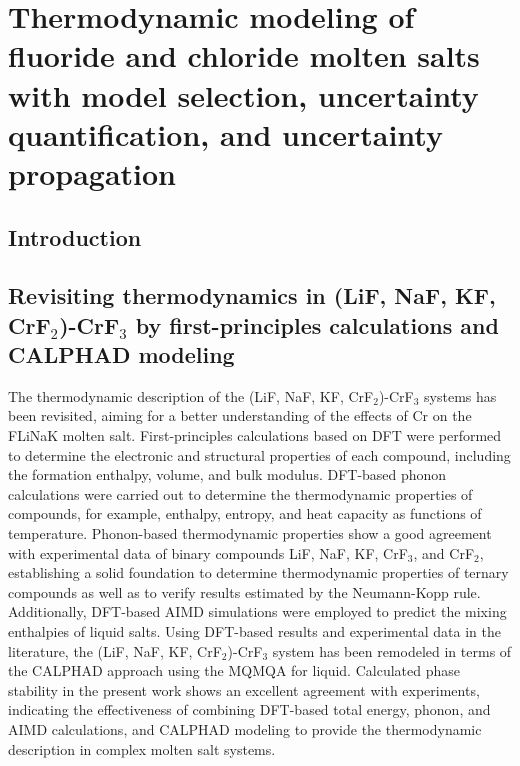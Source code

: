 \chapter{Thermodynamic modeling of fluoride and chloride molten salts with model selection, uncertainty quantification, and uncertainty propagation} \label{chap:moltensalts}

\section{Introduction} \label{moltensalts:sec:intro}

\section{Revisiting thermodynamics in (LiF, NaF, KF, CrF${_2}$)-CrF${_3}$ by first-principles calculations and CALPHAD modeling} \label{moltensalts:sec:FLiNaKCr}
The thermodynamic description of the (LiF, NaF, KF, CrF$_2$)-CrF$_3$ systems has been revisited, aiming for a better understanding of the effects of Cr on the FLiNaK molten salt. First-principles calculations based on DFT were performed to determine the electronic and structural properties of each compound, including the formation enthalpy, volume, and bulk modulus. DFT-based phonon calculations were carried out to determine the thermodynamic properties of compounds, for example, enthalpy, entropy, and heat capacity as functions of temperature. Phonon-based thermodynamic properties show a good agreement with experimental data of binary compounds LiF, NaF, KF, CrF$_3$, and CrF$_2$, establishing a solid foundation to determine thermodynamic properties of ternary compounds as well as to verify results estimated by the Neumann-Kopp rule. Additionally, DFT-based AIMD simulations were employed to predict the mixing enthalpies of liquid salts. Using DFT-based results and experimental data in the literature, the (LiF, NaF, KF, CrF$_2$)-CrF$_3$ system has been remodeled in terms of the CALPHAD approach using the MQMQA for liquid. Calculated phase stability in the present work shows an excellent agreement with experiments, indicating the effectiveness of combining DFT-based total energy, phonon, and AIMD calculations, and CALPHAD modeling to provide the thermodynamic description in complex molten salt systems.

